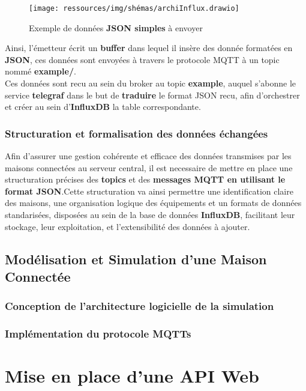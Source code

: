\documentclass[10pt, a4paper]{report}
\begin{document}
	\begin{figure}[h!]
		\centering
		\texttt{[image: ressources/img/shémas/archiInflux.drawio]}
		\caption{Exemple de données \textbf{JSON simples} à envoyer}
		\label{fig:archiInflux}
	\end{figure}
	\vspace{1cm}
	Ainsi, l'émetteur écrit un \textbf{buffer} dans lequel il insère des donnée formatées en \textbf{JSON}, ces données sont envoyées à travers le protocole MQTT à un topic nommé \textbf{example/}.\\
	Ces données sont recu au sein du broker au topic \textbf{example}, auquel s'abonne le service \textbf{telegraf} dans le but de \textbf{traduire} le format JSON recu, afin d'orchestrer et créer au sein d'\textbf{InfluxDB} la table correspondante.
	
	
	\subsubsection{Structuration et formalisation des données échangées}
	
	Afin d'assurer une gestion cohérente et efficace des données transmises par les maisons connectées au serveur central, il est necessaire de mettre en place une structuration précises des \textbf{topics} et des \textbf{messages MQTT en utilisant le format JSON}.Cette structuration va ainsi permettre une identification claire des maisons, une organisation logique des équipements et un formats de données standarisées, disposées au sein de la base de données \textbf{InfluxDB}, facilitant leur stockage, leur exploitation, et l'extensibilité des données à ajouter. 
	
	\subsection{Modélisation et Simulation d'une Maison Connectée}
	\subsubsection{Conception de l'architecture logicielle de la simulation}
	\subsubsection{Implémentation du protocole MQTTs}
	
	\section{Mise en place d'une API Web}
\end{document}
